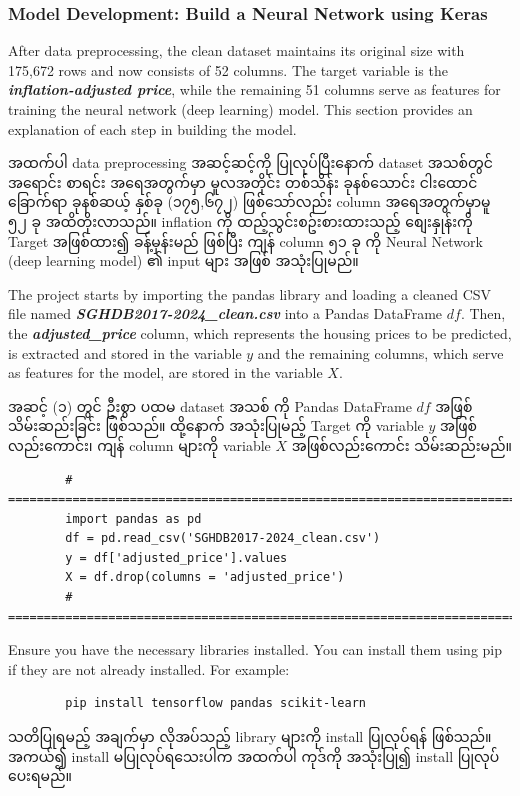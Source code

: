 \subsubsection{Model Development: Build a Neural Network using Keras}
After data preprocessing, the clean dataset maintains its original size with 175,672 rows and now consists of 52 columns. The target variable is the \textit{\textbf{inflation-adjusted price}}, while the remaining 51 columns serve as features for training the neural network (deep learning) model. This section provides an explanation of each step in building the model. 

အထက်ပါ data preprocessing အဆင့်ဆင့်ကို ပြုလုပ်ပြီးနောက် dataset အသစ်တွင် အရောင်း စာရင်း အရေအတွက်မှာ မူလအတိုင်း တစ်သိန်း ခုနစ်သောင်း ငါးထောင် ခြောက်ရာ ခုနစ်ဆယ့် နှစ်ခု (၁၇၅,၆၇၂) ဖြစ်သော်လည်း column အရေအတွက်မှာမူ ၅၂ ခု အထိတိုးလာသည်။ inflation ကို ထည့်သွင်းစဥ်းစားထားသည့် စျေးနှုန်းကို Target အဖြစ်ထား၍ ခန့်မှန်းမည် ဖြစ်ပြီး ကျန် column ၅၁ ခု ကို Neural Network (deep learning model) ၏ input များ အဖြစ် အသုံးပြုမည်။ 

\begin{step} 
The project starts by importing the pandas library and loading a cleaned CSV file named \emph{\textbf{SGHDB2017-2024\_clean.csv}} into a Pandas DataFrame $df$. Then, the \emph{\textbf{adjusted\_price}} column, which represents the housing prices to be predicted, is extracted and stored in the variable $y$ and the remaining columns, which serve as features for the model, are stored in the variable $X$.

အဆင့် (၁) တွင် ဦးစွာ ပထမ  dataset အသစ် ကို Pandas DataFrame $df$ အဖြစ် သိမ်းဆည်းခြင်း ဖြစ်သည်။ ထို့နောက် အသုံးပြုမည့် Target ကို variable $y$ အဖြစ်လည်းကောင်း၊ ကျန် column များကို variable $X$ အဖြစ်လည်းကောင်း သိမ်းဆည်းမည်။ 

        \begin{lstlisting}
        # =========================================================================#
        import pandas as pd
        df = pd.read_csv('SGHDB2017-2024_clean.csv')
        y = df['adjusted_price'].values  
        X = df.drop(columns = 'adjusted_price')  
        # =========================================================================#
    \end{lstlisting}
\end{step}
\begin{remark}
    Ensure you have the necessary libraries installed. You can install them using pip if they are not already installed. For example: 
    \begin{lstlisting}
        pip install tensorflow pandas scikit-learn
    \end{lstlisting}
    သတိပြုရမည့် အချက်မှာ လိုအပ်သည့် library များကို  install ပြုလုပ်ရန် ဖြစ်သည်။ အကယ်၍ install မပြုလုပ်ရသေးပါက အထက်ပါ ကုဒ်ကို အသုံးပြု၍ install ပြုလုပ်ပေးရမည်။ 
\end{remark}


